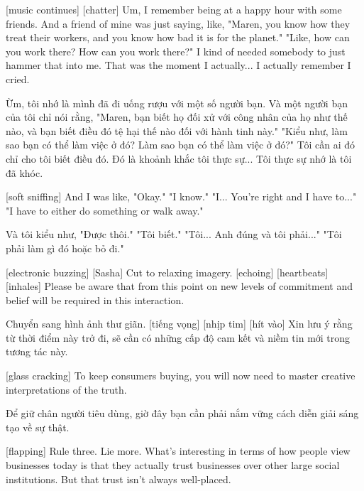 \documentclass[a4paper]{article}
\begin{document}
	[music continues]
	[chatter]
	Um, I remember being at a happy hour with some friends.
	And a friend of mine was just saying, like, "Maren, you know how they treat their workers, and you know how bad it is for the planet."
	"Like, how can you work there? How can you work there?"
	I kind of needed somebody to just hammer that into me.
	That was the moment I actually... I actually remember I cried.
	
	\begin{vietnamese-v2}
		Ừm, tôi nhớ là mình đã đi uống rượu với một số người bạn.
		Và một người bạn của tôi chỉ nói rằng, "Maren, bạn biết họ đối xử với công nhân của họ như thế nào, và bạn biết điều đó tệ hại thế nào đối với hành tinh này."
		"Kiểu như, làm sao bạn có thể làm việc ở đó? Làm sao bạn có thể làm việc ở đó?"
		Tôi cần ai đó chỉ cho tôi biết điều đó.
		Đó là khoảnh khắc tôi thực sự... Tôi thực sự nhớ là tôi đã khóc.
	\end{vietnamese-v2}
	
	[soft sniffing]
	And I was like, "Okay."
	"I know."
	"I... You're right and I have to..."
	"I have to either do something or walk away."
	
	\begin{vietnamese-v2}
		Và tôi kiểu như, "Được thôi."
		"Tôi biết."
		"Tôi... Anh đúng và tôi phải..."
		"Tôi phải làm gì đó hoặc bỏ đi."
	\end{vietnamese-v2}
	
	[electronic buzzing]
	[Sasha] Cut to relaxing imagery. [echoing]
	[heartbeats]
	[inhales]
	Please be aware that from this point on new levels of commitment and belief will be required in this interaction.
	
	\begin{vietnamese-v2}
		 Chuyển sang hình ảnh thư giãn. [tiếng vọng]
		[nhịp tim]
		[hít vào]
		Xin lưu ý rằng từ thời điểm này trở đi, sẽ cần có những cấp độ cam kết và niềm tin mới trong tương tác này.
	\end{vietnamese-v2}
	
	[glass cracking]
	To keep consumers buying, you will now need to master creative interpretations of the truth.
	
	\begin{vietnamese-v2}
		Để giữ chân người tiêu dùng, giờ đây bạn cần phải nắm vững cách diễn giải sáng tạo về sự thật.
	\end{vietnamese-v2}
	
	[flapping]
	Rule three. Lie more.
	What's interesting in terms of how people view businesses today is that they actually trust businesses over other large social institutions.
	But that trust isn't always well-placed.
	
\end{document}
